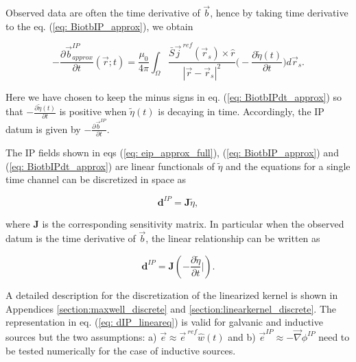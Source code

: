 \documentclass[extra,mreferee]{gji}
\newcommand{\grad}{\vec \nabla}
\renewcommand {\j}  { {\vec j} }
\renewcommand {\b}  { {\vec b} }
\newcommand {\e}  { {\vec e} }
\newcommand{\peta}{\tilde{\eta}}
\newcommand{\eref}{\e^{\ ref}}
\newcommand{\jref}{\j^{\ ref}}
\begin{document}
Observed data are often the time derivative of $\b$, hence by taking time derivative to the eq. (\ref{eq: BiotbIP_approx}), we obtain
\begin{linenomath*}
\begin{equation}
  -\frac{\partial\b^{IP}_{approx}}{\partial t}(\vec{r}; t) = \frac{\mu_0}{4\pi} \int_{\Omega}  \frac{\bar{S}\jref(\vec{r}_s)\times\hat{r}}{|\vec{r}-\vec{r}_s|^2} \Big( -\frac{\partial \peta(t)}{\partial t} \Big) d\vec{r}_s.
  \label{eq: BiotbIPdt_approx}
\end{equation}
\end{linenomath*}
Here we have chosen to keep the minus signs in eq. (\ref{eq: BiotbIPdt_approx}) so that $-\frac{\partial \peta(t)}{\partial t}$ is positive when $\peta(t)$ is decaying in time. 
Accordingly, the IP datum is given by  $-\frac{\partial\b^{IP}}{\partial t}$. 

The IP fields shown in eqs (\ref{eq: eip_approx_full}), (\ref{eq: BiotbIP_approx}) and (\ref{eq: BiotbIPdt_approx}) are linear functionals of $\peta$ and the equations for a single time channel can be discretized in space as
\begin{linenomath*}
\begin{equation}
  \mathbf{d}^{IP} = \mathbf{J}\peta,
  \label{eq: dIP_lineareq}
\end{equation}
\end{linenomath*}
where $\mathbf{J}$ is the corresponding sensitivity matrix. 
In particular when the observed datum is the time derivative of $\b$, the linear relationship can be written as 
\begin{linenomath*}
\begin{equation}
  \mathbf{d}^{IP} = \mathbf{J}(-\frac{\partial \peta}{\partial t}\Big|).
  \label{eq: dIP_lineareq_dbdt}
\end{equation}
\end{linenomath*}
A detailed description for the discretization of the linearized kernel is shown in Appendices \ref{section:maxwell_discrete} and \ref{section:linearkernel_discrete}. 
The representation in eq. (\ref{eq: dIP_lineareq}) is valid for galvanic and inductive sources but the two assumptions: a) $\e \approx \eref \hat{w}(t)$ and b) $\e^{IP} \approx -\grad\phi^{IP}$ need to be tested numerically for the case of inductive sources. 

\end{document}
